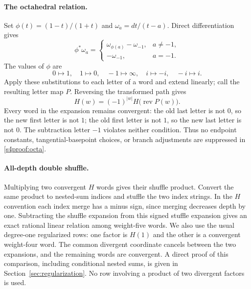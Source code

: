 \documentclass[11pt]{article}
\numberwithin{equation}{section}
\theoremstyle{plain}
\theoremstyle{definition}
\theoremstyle{remark}
\begin{document}
\paragraph{The octahedral relation.}
Set $\phi(t)=(1-t)/(1+t)$ and $\omega_a=dt/(t-a)$.  Direct
differentiation gives
\[
 \phi^*\omega_a=
 \begin{cases}
 \omega_{\phi(a)}-\omega_{-1},&a\ne-1,\\
 -\omega_{-1},&a=-1.
 \end{cases}
\]
The values of $\phi$ are
\[
 0\mapsto1,\quad1\mapsto0,\quad-1\mapsto\infty,
 \quad i\mapsto-i,\quad-i\mapsto i.
\]
Apply these substitutions to each letter of a word and extend linearly;
call the resulting letter map $P$.  Reversing the transformed path gives
\begin{equation}\label{s4proof:octa}
 H(w)=(-1)^{|w|}H\bigl(\operatorname{rev}P(w)\bigr).
\end{equation}
Every word in the expansion remains convergent: the old last letter is
not $0$, so the new first letter is not $1$; the old first letter is not
$1$, so the new last letter is not $0$.  The subtraction letter $-1$
violates neither condition.  Thus no endpoint constants, tangential-basepoint
choices, or branch adjustments are suppressed in \eqref{s4proof:octa}.

\paragraph{All-depth double shuffle.}
Multiplying two convergent $H$ words gives their shuffle product.  Convert
the same product to nested-sum indices and stuffle the two index strings.
In the $H$ convention each index merge has a minus sign, since merging
decreases depth by one.  Subtracting the shuffle expansion from this
signed stuffle expansion gives an exact rational linear relation among
weight-five words.  We also use the usual degree-one regularized rows:
one factor is $H(1)$ and the other is a convergent weight-four word.  The
common divergent coordinate cancels between the two expansions, and
the remaining words are convergent.  A direct proof of this comparison, including conditional nested sums, is given in Section~\ref{sec:regularization}.  No row involving a
product of two divergent factors is used.
\end{document}
